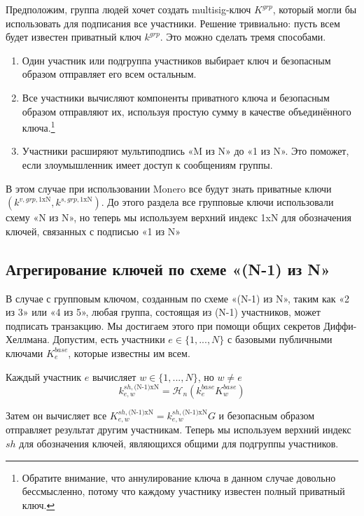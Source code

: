  Предположим, группа людей хочет создать multisig-ключ $K^{grp}$, который могли бы использо\-вать для подписания все участники. Решение тривиально: пусть всем будет известен приват\-ный ключ $k^{grp}$. Это можно сделать тремя способами.
\begin{enumerate}
    \item Один участник или подгруппа участников выбирает ключ и безопасным образом отправ\-ляет его всем остальным.
    \item Все участники вычисляют компоненты приватного ключа и безопасным образом отправ\-ляют их, используя простую сумму в качестве объединённого ключа.\footnote{Обратите внимание, что аннулирование ключа в данном случае довольно бессмысленно, потому что каждому участнику известен полный приватный ключ.}
    \item Участники расширяют мультиподпись «M из N» до «1 из N». Это поможет, если злоумышленник имеет доступ к сообщениям группы.
\end{enumerate}

В этом случае при использовании Monero все будут знать приватные ключи\linebreak $(k^{v,grp,{1\textrm{xN}}},k^{s,grp,{1\textrm{xN}}})$. До этого раздела все групповые ключи использовали схему «N из N», но теперь мы используем верхний индекс 1xN для обозначения ключей, связанных с подписью «1 из N»


\subsection{Агрегирование ключей по схеме «(N-1) из N»}
\label{sec:n-1-of-n}

В случае с групповым ключом, созданным по схеме «(N-1) из N», таким как «2 из 3» или «4 из 5», любая группа, состоящая из (N-1) участников, может подписать транзакцию. Мы достигаем этого при помощи общих секретов Диффи-Хеллмана. Допустим, есть участники $e \in \{1,...,N\}$ с базовыми публичными ключами $K^{base}_e$, которые известны им всем.

Каждый участник $e$ вычисляет $w \in \{1,...,N\}$, но $w \neq e$\vspace{.175cm}
\[k^{sh,\textrm{(N-1)xN}}_{e,w} = \mathcal{H}_n(k^{base}_e K^{base}_w)\]

Затем он вычисляет все $K^{sh,\textrm{(N-1)xN}}_{e,w} = k^{sh,\textrm{(N-1)xN}}_{e,w} G$ и безопасным образом отправляет результат другим участникам. Теперь мы используем верхний индекс $sh$ для обозначения ключей, являющихся общими для подгруппы участников.

